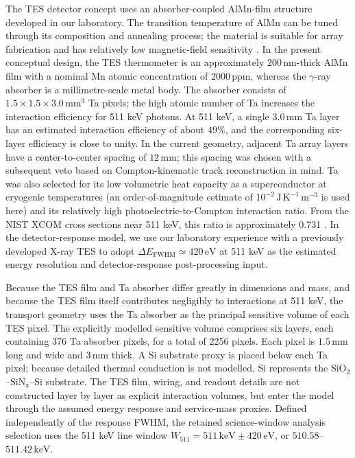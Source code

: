 \documentclass[11pt]{article}
\begin{document}
The TES detector concept uses an absorber-coupled AlMn-film structure developed
in our laboratory. The transition temperature of AlMn can be tuned through its
composition and annealing process; the material is suitable for array fabrication
and has relatively low magnetic-field sensitivity
\cite{Xie2026AlMn,Vavagiakis2017AlMnMagnetic}. In the present conceptual design,
the TES thermometer is an approximately $200\,\mathrm{nm}$-thick AlMn film with
a nominal Mn atomic concentration of $2000\,\mathrm{ppm}$, whereas the $\gamma$-ray absorber is a
millimetre-scale metal body. The absorber consists of
$1.5\times1.5\times3.0\,\mathrm{mm^3}$ Ta pixels; the high atomic number of Ta
increases the interaction efficiency for 511 keV photons. At 511 keV, a single
$3.0\,\mathrm{mm}$ Ta layer has an estimated interaction efficiency of about
$49\%$, and the corresponding six-layer efficiency is close to unity. In the
current geometry, adjacent Ta array layers have a center-to-center spacing of
$12\,\mathrm{mm}$; this spacing was chosen with a subsequent veto based on
Compton-kinematic track reconstruction in mind. Ta was also selected for its low
volumetric heat capacity as a superconductor at cryogenic temperatures (an
order-of-magnitude estimate of $10^{-2}\,\mathrm{J\,K^{-1}\,m^{-3}}$ is used
here) and its relatively high photoelectric-to-Compton interaction ratio. From
the NIST XCOM cross sections near 511 keV, this ratio is approximately 0.731
\cite{NISTXCOM}. In the detector-response model, we use our laboratory experience
with a previously developed X-ray TES \cite{Xie2026AlMn} to adopt
$\Delta E_{\mathrm{FWHM}}\simeq420\,\mathrm{eV}$ at 511 keV as the estimated
energy resolution and detector-response post-processing input.

Because the TES film and Ta absorber differ greatly in dimensions and mass, and
because the TES film itself contributes negligibly to interactions at 511 keV,
the transport geometry uses the Ta absorber as the principal sensitive volume of
each TES pixel. The explicitly modelled sensitive volume comprises six layers,
each containing 376 Ta absorber pixels, for a total of 2256 pixels. Each pixel is
$1.5\,\mathrm{mm}$ long and wide and $3\,\mathrm{mm}$ thick. A Si substrate proxy
is placed below each Ta pixel; because detailed thermal conduction is not modelled,
Si represents the $\mathrm{SiO_2}$--$\mathrm{SiN_x}$--Si substrate. The TES film,
wiring, and readout details are not constructed layer by layer as explicit
interaction volumes, but enter the model through the assumed energy response and
service-mass proxies. Defined independently of the response FWHM, the retained science-window
analysis selection uses the 511 keV line window
$W_{511}=511\,\mathrm{keV}\pm420\,\mathrm{eV}$, or
$510.58$--$511.42\,\mathrm{keV}$.
\end{document}
